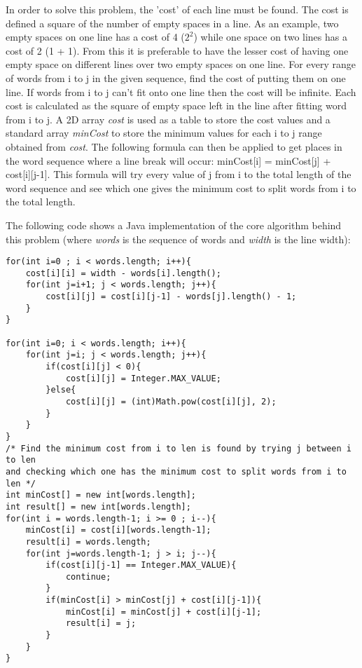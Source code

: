 
In order to solve this problem, the 'cost' of each line must be found. The cost is defined a square of the number of empty spaces in a line. As an example, two empty spaces on one line has a cost of 4 ($2^2$) while one space on two lines has a cost of 2 (1 + 1). From this it is preferable to have the lesser cost of having one empty space on different lines over two empty spaces on one line. For every range of words from i to j in the given sequence, find the cost of putting them on one line. If words from i to j can't fit onto one line then the cost will be infinite. Each cost is calculated as the square of empty space left in the line after fitting word from i to j. A 2D array \textit{cost} is used as a table to store the cost values and a standard array \textit{minCost} to store the minimum values for each i to j range obtained from \textit{cost}. The following formula can then be applied to get places in the word sequence where a line break will occur: minCost[i] = minCost[j] + cost[i][j-1]. This formula will try every value of j from i to the total length of the word sequence and see which one gives the minimum cost to split words from i to the total length.

\smallbreak\noindent
The following code shows a Java implementation of the core algorithm behind this problem (where \textit{words} is the sequence of words and \textit{width} is the line width):

\begin{lstlisting}
for(int i=0 ; i < words.length; i++){
	cost[i][i] = width - words[i].length();
	for(int j=i+1; j < words.length; j++){
		cost[i][j] = cost[i][j-1] - words[j].length() - 1; 
	}
}

for(int i=0; i < words.length; i++){
	for(int j=i; j < words.length; j++){
		if(cost[i][j] < 0){
			cost[i][j] = Integer.MAX_VALUE;
		}else{
			cost[i][j] = (int)Math.pow(cost[i][j], 2);
		}
	}
}
/* Find the minimum cost from i to len is found by trying j between i to len
and checking which one has the minimum cost to split words from i to len */
int minCost[] = new int[words.length];
int result[] = new int[words.length];
for(int i = words.length-1; i >= 0 ; i--){
	minCost[i] = cost[i][words.length-1];
	result[i] = words.length;
	for(int j=words.length-1; j > i; j--){
		if(cost[i][j-1] == Integer.MAX_VALUE){
			continue;
		}
		if(minCost[i] > minCost[j] + cost[i][j-1]){
			minCost[i] = minCost[j] + cost[i][j-1];
			result[i] = j;
		}
	}
}
\end{lstlisting}

